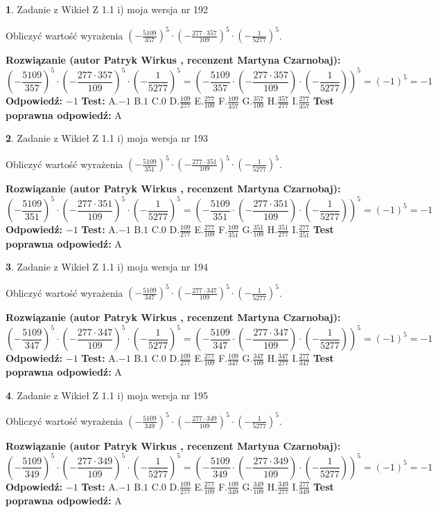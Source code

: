\documentclass[12pt, a4paper]{article}
\theoremstyle{definition} %
\newtheorem{zad}{}
\newcommand{\zadStart}[1]{\begin{zad}#1\newline}
\newcommand{\zadStop}{\end{zad}}
\newcommand{\rozwStart}[2]{\noindent \textbf{Rozwiązanie (autor #1 , recenzent #2): }\newline}
\newcommand{\rozwStop}{\newline}
\newcommand{\odpStart}{\noindent \textbf{Odpowiedź:}\newline}
\newcommand{\odpStop}{\newline}
\newcommand{\testStart}{\noindent \textbf{Test:}\newline}
\newcommand{\testStop}{\newline}
\newcommand{\kluczStart}{\noindent \textbf{Test poprawna odpowiedź:}\newline}
\newcommand{\kluczStop}{\newline}
\begin{document}
\zadStart{Zadanie z Wikieł Z 1.1 i) moja wersja nr 192}

Obliczyć wartość wyrażenia $(-\frac{5109}{357})^{5} \cdot (-\frac{277 \cdot 357}{109})^{5} \cdot (-\frac{1}{5277})^{5}$.
\zadStop
\rozwStart{Patryk Wirkus}{Martyna Czarnobaj}
$$(-\frac{5109}{357})^{5} \cdot (-\frac{277 \cdot 357}{109})^{5} \cdot (-\frac{1}{5277})^{5} = (-\frac{5109}{357} \cdot (-\frac{277 \cdot 357}{109}) \cdot (-\frac{1}{5277}))^{5} = (-1)^{5} = -1$$
\rozwStop
\odpStart
$-1$
\odpStop
\testStart
A.$-1$ B.$1$ C.$0$ D.$\frac{109}{277}$ E.$\frac{277}{109}$
F.$\frac{109}{357}$ G.$\frac{357}{109}$
H.$\frac{357}{277}$
I.$\frac{277}{357}$
\testStop
\kluczStart
A
\kluczStop



\zadStart{Zadanie z Wikieł Z 1.1 i) moja wersja nr 193}

Obliczyć wartość wyrażenia $(-\frac{5109}{351})^{5} \cdot (-\frac{277 \cdot 351}{109})^{5} \cdot (-\frac{1}{5277})^{5}$.
\zadStop
\rozwStart{Patryk Wirkus}{Martyna Czarnobaj}
$$(-\frac{5109}{351})^{5} \cdot (-\frac{277 \cdot 351}{109})^{5} \cdot (-\frac{1}{5277})^{5} = (-\frac{5109}{351} \cdot (-\frac{277 \cdot 351}{109}) \cdot (-\frac{1}{5277}))^{5} = (-1)^{5} = -1$$
\rozwStop
\odpStart
$-1$
\odpStop
\testStart
A.$-1$ B.$1$ C.$0$ D.$\frac{109}{277}$ E.$\frac{277}{109}$
F.$\frac{109}{351}$ G.$\frac{351}{109}$
H.$\frac{351}{277}$
I.$\frac{277}{351}$
\testStop
\kluczStart
A
\kluczStop



\zadStart{Zadanie z Wikieł Z 1.1 i) moja wersja nr 194}

Obliczyć wartość wyrażenia $(-\frac{5109}{347})^{5} \cdot (-\frac{277 \cdot 347}{109})^{5} \cdot (-\frac{1}{5277})^{5}$.
\zadStop
\rozwStart{Patryk Wirkus}{Martyna Czarnobaj}
$$(-\frac{5109}{347})^{5} \cdot (-\frac{277 \cdot 347}{109})^{5} \cdot (-\frac{1}{5277})^{5} = (-\frac{5109}{347} \cdot (-\frac{277 \cdot 347}{109}) \cdot (-\frac{1}{5277}))^{5} = (-1)^{5} = -1$$
\rozwStop
\odpStart
$-1$
\odpStop
\testStart
A.$-1$ B.$1$ C.$0$ D.$\frac{109}{277}$ E.$\frac{277}{109}$
F.$\frac{109}{347}$ G.$\frac{347}{109}$
H.$\frac{347}{277}$
I.$\frac{277}{347}$
\testStop
\kluczStart
A
\kluczStop



\zadStart{Zadanie z Wikieł Z 1.1 i) moja wersja nr 195}

Obliczyć wartość wyrażenia $(-\frac{5109}{349})^{5} \cdot (-\frac{277 \cdot 349}{109})^{5} \cdot (-\frac{1}{5277})^{5}$.
\zadStop
\rozwStart{Patryk Wirkus}{Martyna Czarnobaj}
$$(-\frac{5109}{349})^{5} \cdot (-\frac{277 \cdot 349}{109})^{5} \cdot (-\frac{1}{5277})^{5} = (-\frac{5109}{349} \cdot (-\frac{277 \cdot 349}{109}) \cdot (-\frac{1}{5277}))^{5} = (-1)^{5} = -1$$
\rozwStop
\odpStart
$-1$
\odpStop
\testStart
A.$-1$ B.$1$ C.$0$ D.$\frac{109}{277}$ E.$\frac{277}{109}$
F.$\frac{109}{349}$ G.$\frac{349}{109}$
H.$\frac{349}{277}$
I.$\frac{277}{349}$
\testStop
\kluczStart
A
\kluczStop
\end{document}
